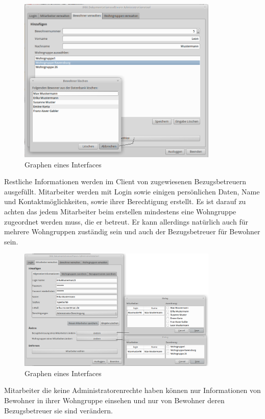 \begin{figure}[h]
	\begin{center}
		\includegraphics[keepaspectratio=true, width=0.85\textwidth]{pics/admin2.png}
		\caption{Graphen eines Interfaces}
		\label{Admindialog_Bewohner}
	\end{center}
\end{figure}
\FloatBarrier
\noindent
Restliche Informationen werden im Client von zugewiesenen Bezugsbetreuern ausgefüllt.
\newpage
\noindent
Mitarbeiter werden mit Login sowie einigen persönlichen Daten, Name und Kontaktmöglichkeiten, sowie ihrer Berechtigung erstellt. Es ist darauf zu achten das jedem Mitarbeiter beim erstellen mindestens eine Wohngruppe zugeordnet werden muss, die er betreut. Er kann allerdings natürlich auch für mehrere Wohngruppen zuständig sein und auch der Bezugsbetreuer für Bewohner sein.
\begin{figure}[h]
	\begin{center}
		\includegraphics[keepaspectratio=true, width=0.85\textwidth]{pics/admin1.png}
		\caption{Graphen eines Interfaces}
		\label{Admindialog_Bewohner2}
	\end{center}
\end{figure}
\FloatBarrier
\noindent
Mitarbeiter die keine Administratorenrechte haben können nur Informationen von Bewohner in ihrer Wohngruppe einsehen und nur von Bewohner deren Bezugsbetreuer sie sind verändern.
